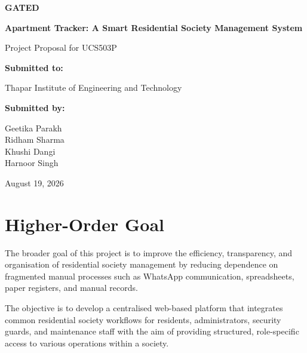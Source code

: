 \documentclass[11pt,a4paper]{article}
\begin{document}

\begin{center}

{\fontsize{20}{24}\selectfont\bfseries GATED}

\vspace{0.5cm}

{\fontsize{18}{22}\selectfont\bfseries
Apartment Tracker: A Smart Residential Society Management System
}

\vspace{0.5cm}

{\fontsize{14}{17}\selectfont
Project Proposal for UCS503P
}

\vfill

\textbf{Submitted to:}

Thapar Institute of Engineering and Technology

\vspace{0.5cm}

\textbf{Submitted by:}

Geetika Parakh\\
Ridham Sharma\\
Khushi Dangi\\
Harnoor Singh

\vfill

August 19, 2026

\end{center}

\newpage


\section{Higher-Order Goal}

The broader goal of this project is to improve the efficiency, transparency, and organisation of residential society management by reducing dependence on fragmented manual processes such as WhatsApp communication, spreadsheets, paper registers, and manual records.

The objective is to develop a centralised web-based platform that integrates common residential society workflows for residents, administrators, security guards, and maintenance staff with the aim of providing structured, role-specific access to various operations within a society.
\end{document}
